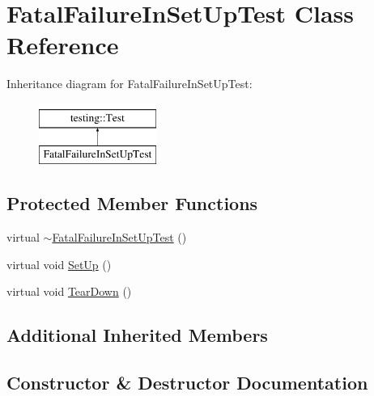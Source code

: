 \hypertarget{classFatalFailureInSetUpTest}{}\section{Fatal\+Failure\+In\+Set\+Up\+Test Class Reference}
\label{classFatalFailureInSetUpTest}
Inheritance diagram for Fatal\+Failure\+In\+Set\+Up\+Test\+:\begin{figure}[H]
\begin{center}
\leavevmode
\includegraphics[height=2.000000cm]{classFatalFailureInSetUpTest}
\end{center}
\end{figure}
\subsection*{Protected Member Functions}
\begin{DoxyCompactItemize}
\item 
virtual \mbox{\hyperlink{classFatalFailureInSetUpTest_a915ca362b046259c3586c1ab72bb0a93}{$\sim$\+Fatal\+Failure\+In\+Set\+Up\+Test}} ()
\item 
virtual void \mbox{\hyperlink{classFatalFailureInSetUpTest_a455696f86fb5f5393624221ccb79b373}{Set\+Up}} ()
\item 
virtual void \mbox{\hyperlink{classFatalFailureInSetUpTest_a457707161063e08f7b6600ec5db449e4}{Tear\+Down}} ()
\end{DoxyCompactItemize}
\subsection*{Additional Inherited Members}


\subsection{Constructor \& Destructor Documentation}
\mbox{\label{classFatalFailureInSetUpTest_a915ca362b046259c3586c1ab72bb0a93}} 
